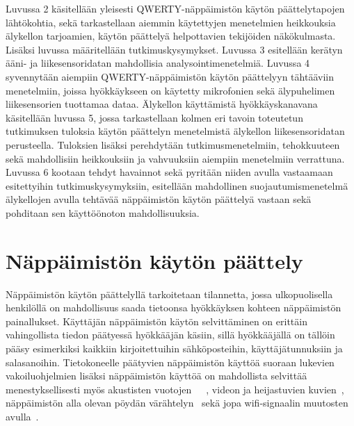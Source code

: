 \documentclass[finnish]{tktltiki2}
\theoremstyle{definition}
\theoremstyle{remark}
\begin{document}
Luvussa 2 käsitellään yleisesti QWERTY-näppäimistön käytön päättelytapojen lähtökohtia, sekä tarkastellaan aiemmin käytettyjen menetelmien heikkouksia älykellon tarjoamien, käytön päättelyä helpottavien tekijöiden näkökulmasta. Lisäksi luvussa määritellään tutkimuskysymykset. Luvussa 3 esitellään kerätyn ääni- ja liikesensoridatan mahdollisia analysointimenetelmiä. Luvussa 4 syvennytään aiempiin QWERTY-näppäimistön käytön päättelyyn tähtääviin menetelmiin, joissa hyökkäykseen on käytetty mikrofonien sekä älypuhelimen liikesensorien tuottamaa dataa. Älykellon käyttämistä hyökkäyskanavana käsitellään luvussa 5, jossa tarkastellaan kolmen eri tavoin toteutetun tutkimuksen tuloksia käytön päättelyn menetelmistä älykellon liikesensoridatan perusteella. Tuloksien lisäksi perehdytään tutkimusmenetelmiin, tehokkuuteen sekä  mahdollisiin heikkouksiin ja vahvuuksiin aiempiin menetelmiin verrattuna. Luvussa 6 kootaan tehdyt havainnot sekä pyritään niiden avulla vastaamaan esitettyihin tutkimuskysymyksiin, esitellään mahdollinen suojautumismenetelmä älykellojen avulla tehtävää näppäimistön käytön päättelyä vastaan sekä pohditaan sen käyttöönoton mahdollisuuksia. 


\section{Näppäimistön käytön päättely}
Näppäimistön käytön päättelyllä tarkoitetaan tilannetta, jossa ulkopuolisella henkilöllä on mahdollisuus saada tietoonsa hyökkäyksen kohteen näppäimistön painallukset.
Käyttäjän näppäimistön käytön selvittäminen on erittäin vahingollista tiedon päätyessä hyökkääjän käsiin, sillä hyökkääjällä on tällöin pääsy esimerkiksi kaikkiin kirjoitettuihin sähköposteihin, käyttäjätunnuksiin ja salasanoihin. Tietokoneelle päätyvien näppäimistön käyttöä suoraan lukevien vakoiluohjelmien lisäksi näppäimistön käyttöä on mahdollista selvittää menestyksellisesti myös akustisten vuotojen~\cite{berger}~\cite{zhu}~\cite{aso}, videon ja heijastuvien kuvien~\cite{balz}, näppäimistön alla olevan pöydän värähtelyn~\cite{mar} sekä jopa wifi-signaalin muutosten avulla~\cite{ali}.
\end{document}
